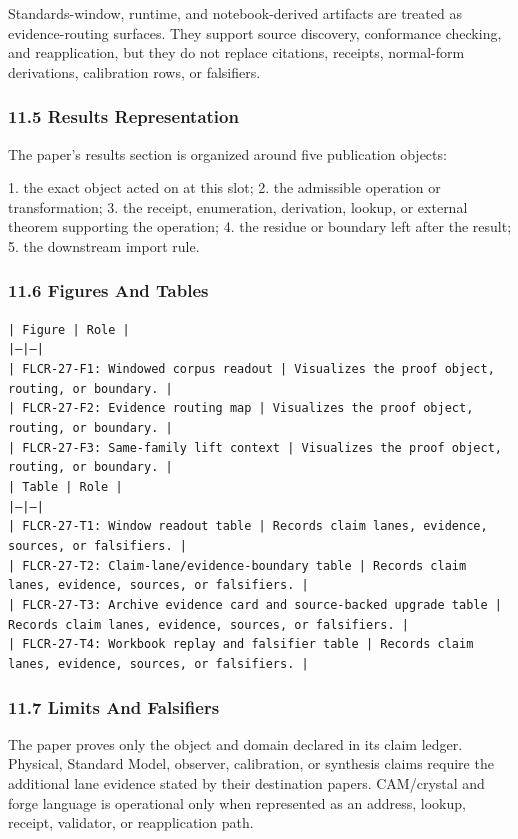 \documentclass[11pt]{article}
\begin{document}
Standards-window, runtime, and notebook-derived artifacts are treated
as evidence-routing surfaces. They support source discovery, conformance
checking, and reapplication, but they do not replace citations, receipts,
normal-form derivations, calibration rows, or falsifiers.

\subsubsection*{11.5 Results Representation}

The paper's results section is organized around five publication objects:

1. the exact object acted on at this slot;
2. the admissible operation or transformation;
3. the receipt, enumeration, derivation, lookup, or external theorem supporting
   the operation;
4. the residue or boundary left after the result;
5. the downstream import rule.

\subsubsection*{11.6 Figures And Tables}

\noindent\texttt{| Figure | Role |}\\
\noindent\texttt{|---|---|}\\
\noindent\texttt{| FLCR-27-F1: Windowed corpus readout | Visualizes the proof object, routing, or boundary. |}\\
\noindent\texttt{| FLCR-27-F2: Evidence routing map | Visualizes the proof object, routing, or boundary. |}\\
\noindent\texttt{| FLCR-27-F3: Same-family lift context | Visualizes the proof object, routing, or boundary. |}\\

\noindent\texttt{| Table | Role |}\\
\noindent\texttt{|---|---|}\\
\noindent\texttt{| FLCR-27-T1: Window readout table | Records claim lanes, evidence, sources, or falsifiers. |}\\
\noindent\texttt{| FLCR-27-T2: Claim-lane/evidence-boundary table | Records claim lanes, evidence, sources, or falsifiers. |}\\
\noindent\texttt{| FLCR-27-T3: Archive evidence card and source-backed upgrade table | Records claim lanes, evidence, sources, or falsifiers. |}\\
\noindent\texttt{| FLCR-27-T4: Workbook replay and falsifier table | Records claim lanes, evidence, sources, or falsifiers. |}\\

\subsubsection*{11.7 Limits And Falsifiers}

The paper proves only the object and domain declared in its claim ledger.
Physical, Standard Model, observer, calibration, or synthesis claims require
the additional lane evidence stated by their destination papers. CAM/crystal
and forge language is operational only when represented as an address, lookup,
receipt, validator, or reapplication path.
\end{document}
